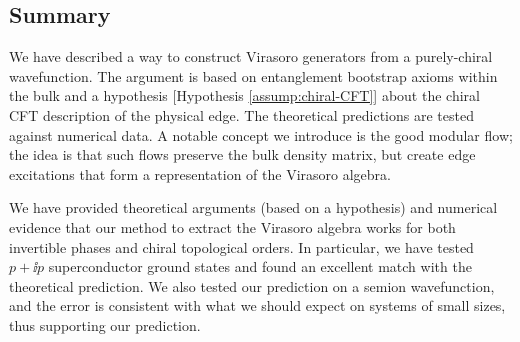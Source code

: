 \documentclass[12pt, nofootinbib]{article}
\theoremstyle{plain}
\theoremstyle{assumption}
\theoremstyle{definition}
\theoremstyle{plain}
\theoremstyle{plain}
\theoremstyle{plain}
\theoremstyle{plain}
\theoremstyle{plain}
\begin{document}
\subsection{Summary}

We have described a way to construct Virasoro generators from a purely-chiral wavefunction. The argument is based on entanglement bootstrap axioms within the bulk and a hypothesis [Hypothesis \ref{assump:chiral-CFT}] about the chiral CFT description of the physical edge. The theoretical predictions are tested against numerical data. A notable concept we introduce is the good modular flow; the idea is that such flows preserve the bulk density matrix, but create edge excitations that form a representation of the Virasoro algebra. 

We have provided theoretical arguments (based on a hypothesis) and numerical evidence that our method to extract the Virasoro algebra works for both invertible phases and chiral topological orders. In particular, we have tested $p+\ii p$ superconductor ground states and found an excellent match with the theoretical prediction. We also tested our prediction on a semion wavefunction, and the error is consistent with what we should expect on systems of small sizes, thus supporting our prediction.
\end{document}
